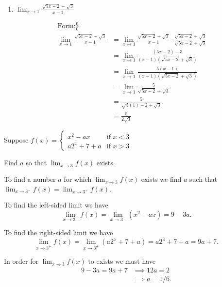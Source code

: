 \documentclass[nooutcomes]{ximera}
\begin{document}
\begin{problem}
\begin{enumerate}
	
	\item  $ \lim_{x \to 1} \frac{\sqrt{5x-2} - \sqrt{3}}{x-1} $
	\begin{freeResponse}
	\begin{align*}
	\text{Form:} \frac{0}{0}\\
	\lim_{x \to 1} \frac{\sqrt{5x-2} - \sqrt{3}}{x-1} &= \lim_{x \to 1} \frac{\sqrt{5x-2} - \sqrt{3}}{x-1} \cdot \frac{\sqrt{5x-2} + \sqrt{3}}{\sqrt{5x-2} + \sqrt{3}} \\
	&= \lim_{x \to 1} \frac{(5x-2)-3}{(x-1)(\sqrt{5x-2} + \sqrt{3})} \\
	&= \lim_{x \to 1} \frac{5(x-1)}{(x-1)(\sqrt{5x-2} + \sqrt{3})} \\
	&= \lim_{x \to 1} \frac{5}{\sqrt{5x-2} + \sqrt{3}} \\
	&=   \frac{5}{\sqrt{5(1)-2} + \sqrt{3}} \\
	&= \frac{5}{2 \sqrt{3}} 
	\end{align*}
	\end{freeResponse}
	\end{enumerate}
\end{problem}
	
	
	
	
			
			

\begin{problem}
Suppose
	$f(x) =   \left\{ \begin{array}{lr}
	x^2 - ax 	&	\text{if } x < 3	\\
	a2^x + 7 + a	&	\text{if } x > 3	\end{array} \right.  $
	
	Find $a$ so that $ \lim_{x \to 3} f(x)  $ exists.
	\begin{freeResponse}
	 To find a number $a$ for which $\lim_{x \to 3} f(x)$ exists we find $a$ such that $\lim_{x \to 3^-} f(x) = \lim_{x \to 3^+} f(x)$.

    To find the left-sided limit we have
    \[
      \lim_{x \to 3^-} f(x) = \lim_{x \to 3^-} (x^2 - ax) = 9 - 3a.
    \]
  
    To find the right-sided limit we have
    \[
      \lim_{x \to 3^+} f(x) = \lim_{x \to 3^+} (a2^x + 7 + a) = a2^3 + 7 + a = 9a + 7.
    \]

    In order for $\lim_{x \to 3} f(x)$ to exists we must have
    \begin{align*}
      9 - 3a = 9a + 7 &\implies 12a = 2\\
                      &\implies a = 1/6.
    \end{align*}
	\end{freeResponse}
\end{problem}
	
\end{document}
